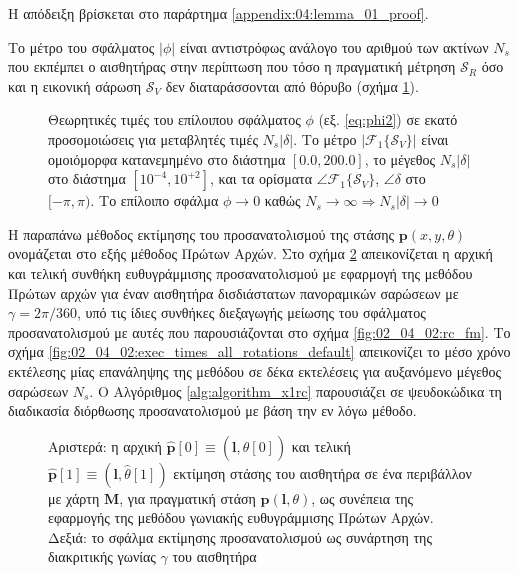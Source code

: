Η απόδειξη βρίσκεται στο παράρτημα \ref{appendix:04:lemma_01_proof}.

\begin{corollary}
  Το μέτρο του σφάλματος $|\phi|$ είναι αντιστρόφως ανάλογο του αριθμού των
  ακτίνων $N_s$ που εκπέμπει ο αισθητήρας στην περίπτωση που τόσο η πραγματική
  μέτρηση $\mathcal{S}_R$ όσο και η εικονική σάρωση $\mathcal{S}_V$ δεν
  διαταράσσονται από θόρυβο (σχήμα \ref{fig:02_04_02:phi_rc_x1}).
\end{corollary}


\begin{figure}[!h]\centering
  \vspace{0.5cm}
  
  \vspace{1.0cm}
  \caption{\small Θεωρητικές τιμές του επίλοιπου σφάλματος $\phi$ (εξ.
           \ref{eq:phi2}) σε εκατό προσομοιώσεις για μεταβλητές τιμές
           $N_s |\delta|$. Το μέτρο $|\mathcal{F}_1\{\mathcal{S}_V\}|$ είναι
           ομοιόμορφα κατανεμημένο στο διάστημα $[0.0, 200.0]$, το μέγεθος
           $N_s |\delta|$ στο διάστημα $[10^{-4}, 10^{+2}]$, και τα ορίσματα
           $\angle \mathcal{F}_1\{\mathcal{S}_V\}$, $\angle \delta$ στο
           $[-\pi, \pi)$. Το επίλοιπο σφάλμα $\phi \rightarrow 0$ καθώς
           $N_s \rightarrow \infty \Rightarrow N_s |\delta| \rightarrow 0$}
  \label{fig:02_04_02:phi_rc_x1}
\end{figure}

Η παραπάνω μέθοδος εκτίμησης του προσανατολισμού της στάσης
$\bm{p}(x,y,\theta)$ ονομάζεται στο εξής μέθοδος Πρώτων Αρχών.  Στο σχήμα
\ref{fig:02_04_02:rc_x1} απεικονίζεται η αρχική και τελική συνθήκη
ευθυγράμμισης προσανατολισμού με εφαρμογή της μεθόδου Πρώτων αρχών για έναν
αισθητήρα δισδιάστατων πανοραμικών σαρώσεων με $\gamma = 2\pi/360$, υπό τις
ίδιες συνθήκες διεξαγωγής μείωσης του σφάλματος προσανατολισμού με αυτές που
παρουσιάζονται στο σχήμα \ref{fig:02_04_02:rc_fm}. Το σχήμα
\ref{fig:02_04_02:exec_times_all_rotations_default} απεικονίζει το μέσο χρόνο
εκτέλεσης μίας επανάληψης της μεθόδου σε δέκα εκτελέσεις για αυξανόμενο μέγεθος
σαρώσεων $N_s$. Ο Αλγόριθμος \ref{alg:algorithm_x1rc} παρουσιάζει σε
ψευδοκώδικα τη διαδικασία διόρθωσης προσανατολισμού με βάση την εν λόγω μέθοδο.

\begin{figure}[!h]\centering
  \vspace{0.5cm}
  
  \vspace{0.5cm}
  \caption{\small Αριστερά: η αρχική
           $\hat{\bm{p}}[0] \equiv (\bm{l},\hat{\theta}[0])$ και τελική
           $\hat{\bm{p}}[1] \equiv (\bm{l},\hat{\theta}[1])$ εκτίμηση στάσης του
           αισθητήρα σε ένα περιβάλλον με χάρτη $\bm{M}$, για πραγματική στάση
           $\bm{p}(\bm{l},\theta)$, ως συνέπεια της εφαρμογής της μεθόδου
           γωνιακής ευθυγράμμισης Πρώτων Αρχών. Δεξιά: το σφάλμα εκτίμησης
           προσανατολισμού ως συνάρτηση της διακριτικής γωνίας $\gamma$ του
           αισθητήρα}
  \label{fig:02_04_02:rc_x1}
\end{figure}

